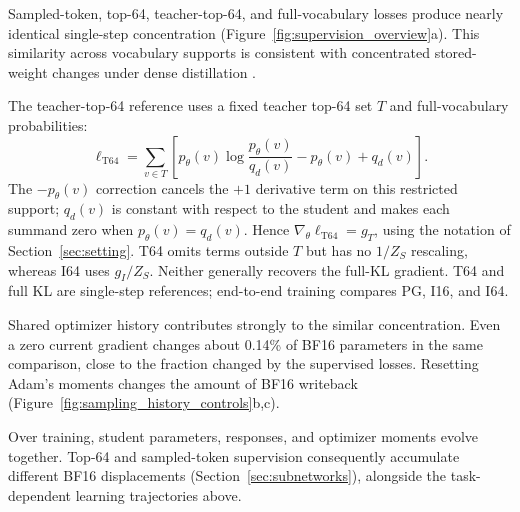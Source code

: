 Sampled-token, top-64, teacher-top-64, and full-vocabulary losses produce nearly identical single-step concentration (Figure~\ref{fig:supervision_overview}a). This similarity across vocabulary supports is consistent with concentrated stored-weight changes under dense distillation \citep{yu2026denseupdates}.

The teacher-top-64 reference uses a fixed teacher top-64 set $T$ and full-vocabulary probabilities:
\begin{equation}
\ell_{\mathrm{T64}}=\sum_{v\in T}\left[p_\theta(v)\log\frac{p_\theta(v)}{q_d(v)}-p_\theta(v)+q_d(v)\right].
\label{eq:t64}
\end{equation}
The $-p_\theta(v)$ correction cancels the $+1$ derivative term on this restricted support; $q_d(v)$ is constant with respect to the student and makes each summand zero when $p_\theta(v)=q_d(v)$. Hence $\nabla_\theta\ell_{\mathrm{T64}}=g_T$, using the notation of Section~\ref{sec:setting}. T64 omits terms outside $T$ but has no $1/Z_S$ rescaling, whereas I64 uses $g_I/Z_S$. Neither generally recovers the full-KL gradient. T64 and full KL are single-step references; end-to-end training compares PG, I16, and I64.

Shared optimizer history contributes strongly to the similar concentration. Even a zero current gradient changes about 0.14\% of BF16 parameters in the same comparison, close to the fraction changed by the supervised losses. Resetting Adam's moments changes the amount of BF16 writeback (Figure~\ref{fig:sampling_history_controls}b,c).



Over training, student parameters, responses, and optimizer moments evolve together. Top-64 and sampled-token supervision consequently accumulate different BF16 displacements (Section~\ref{sec:subnetworks}), alongside the task-dependent learning trajectories above.

\FloatBarrier
